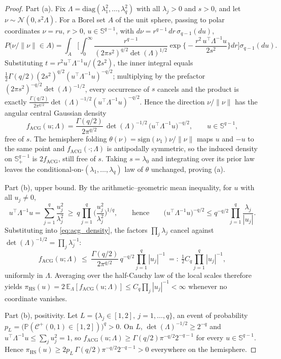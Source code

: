 \documentclass[11pt]{article}
\theoremstyle{definition}
\theoremstyle{plain}
\newcommand{\E}{\mathbb{E}}
\begin{document}
\begin{proof}
Part (a). Fix $\Lambda=\mathrm{diag}(\lambda_1^2,\dots,\lambda_q^2)$ with all $\lambda_j>0$ and $s>0$, and let $\nu\sim\mathcal N(0,s^2\Lambda)$. For a Borel set $A$ of the unit sphere, passing to polar coordinates $\nu=ru$, $r>0$, $u\in\mathbb S^{q-1}$, with $d\nu=r^{q-1}\,dr\,\sigma_{q-1}(du)$,
\[
P\big(\nu/\|\nu\|\in A\big)
=\int_A\bigg[\int_0^\infty\frac{r^{q-1}}{(2\pi s^2)^{q/2}\det(\Lambda)^{1/2}}
\exp\Big\{-\frac{r^2\,u^\top\Lambda^{-1}u}{2s^2}\Big\}dr\bigg]\sigma_{q-1}(du).
\]
Substituting $t=r^2u^\top\Lambda^{-1}u/(2s^2)$, the inner integral equals $\tfrac12\Gamma(q/2)(2s^2)^{q/2}(u^\top\Lambda^{-1}u)^{-q/2}$; multiplying by the prefactor $(2\pi s^2)^{-q/2}\det(\Lambda)^{-1/2}$, every occurrence of $s$ cancels and the product is exactly $\frac{\Gamma(q/2)}{2\pi^{q/2}}\det(\Lambda)^{-1/2}(u^\top\Lambda^{-1}u)^{-q/2}$. Hence the direction $\nu/\|\nu\|$ has the angular central Gaussian density
\begin{equation}
f_{\mathrm{ACG}}(u;\Lambda)=\frac{\Gamma(q/2)}{2\pi^{q/2}}\,\det(\Lambda)^{-1/2}\,\big(u^\top\Lambda^{-1}u\big)^{-q/2},
\qquad u\in\mathbb S^{q-1},
\label{eq:acg_density}
\end{equation}
free of $s$. The hemisphere folding $\theta(\nu)=\mathrm{sign}(\nu_1)\nu/\|\nu\|$ maps $u$ and $-u$ to the same point and $f_{\mathrm{ACG}}(\cdot;\Lambda)$ is antipodally symmetric, so the induced density on $\mathbb S^{q-1}_+$ is $2f_{\mathrm{ACG}}$, still free of $s$. Taking $s=\lambda_0$ and integrating over its prior law leaves the conditional-on-$(\lambda_1,\dots,\lambda_q)$ law of $\theta$ unchanged, proving (a).

Part (b), upper bound. By the arithmetic--geometric mean inequality, for $u$ with all $u_j\neq0$,
\[
u^\top\Lambda^{-1}u=\sum_{j=1}^q\frac{u_j^2}{\lambda_j^2}
\ \ge\ q\prod_{j=1}^q\Big(\frac{u_j^2}{\lambda_j^2}\Big)^{1/q},
\qquad\text{hence}\qquad
\big(u^\top\Lambda^{-1}u\big)^{-q/2}\le q^{-q/2}\prod_{j=1}^q\frac{\lambda_j}{|u_j|}.
\]
Substituting into \eqref{eq:acg_density}, the factors $\prod_j\lambda_j$ cancel against $\det(\Lambda)^{-1/2}=\prod_j\lambda_j^{-1}$:
\[
f_{\mathrm{ACG}}(u;\Lambda)\ \le\ \frac{\Gamma(q/2)}{2\pi^{q/2}}\,q^{-q/2}\prod_{j=1}^q|u_j|^{-1}
\ =:\ \tfrac12 C_q\prod_{j=1}^q|u_j|^{-1},
\]
uniformly in $\Lambda$. Averaging over the half-Cauchy law of the local scales therefore yields
$\pi_{\mathrm{HS}}(u)=2\,\E_\Lambda[f_{\mathrm{ACG}}(u;\Lambda)]\le C_q\prod_j|u_j|^{-1}<\infty$ whenever no coordinate vanishes.

Part (b), positivity. Let $L=\{\lambda_j\in[1,2],\ j=1,\dots,q\}$, an event of probability $p_L=\big(\mathbb P(\mathcal C^+(0,1)\in[1,2])\big)^q>0$. On $L$, $\det(\Lambda)^{-1/2}\ge2^{-q}$ and $u^\top\Lambda^{-1}u\le\sum_ju_j^2=1$, so $f_{\mathrm{ACG}}(u;\Lambda)\ge\Gamma(q/2)\pi^{-q/2}2^{-q-1}$ for every $u\in\mathbb S^{q-1}$. Hence
$\pi_{\mathrm{HS}}(u)\ge2p_L\,\Gamma(q/2)\pi^{-q/2}2^{-q-1}>0$ everywhere on the hemisphere.


\end{proof}
\end{document}
